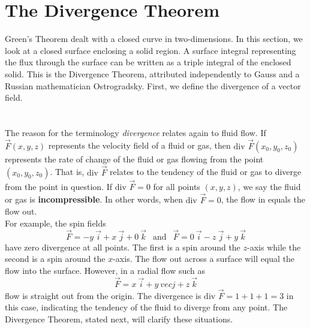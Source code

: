 \section{The Divergence Theorem}\label{sec:div_theorem}

Green's Theorem dealt with a closed curve in two-dimensions.  In this section, we look at a closed surface enclosing a solid region.  A surface integral representing the flux through the surface can be written as a triple integral of the enclosed solid.  This is the Divergence Theorem, attributed independently to Gauss and a Russian mathematician Ostrogradsky. First, we define the divergence of a vector field.\\

\\

\\

The reason for the terminology \emph{divergence} relates again to fluid flow. If $\vec F(x,y,z)$ represents the velocity field of a fluid or gas, then $\text{div } \vec F (x_0,y_0,z_0)$ represents the rate of change of the fluid or gas flowing from the point $(x_0,y_0,z_0)$. That is, $\text{div } \vec F$ relates to the tendency of the fluid or gas to diverge from the point in question. If $\text{div } \vec F = 0$ for all points $(x,y,z)$, we say the fluid or gas is \textbf{incompressible}. In other words, when $\text{div } \vec F = 0$, the flow in equals the flow out.\\

For example, the spin fields $$\vec F = -y \: \vec i + x \: \vec j + 0 \: \vec k \: \: \text{ and } \: \: \vec F = 0 \: \vec i - z \: \vec j + y \: \vec k$$
have zero divergence at all points.  The first is a spin around the $z$-axis while the second is a spin around the $x$-axis.  The flow out across a surface will equal the flow into the surface. However, in a radial flow such as $$\vec F = x \: \vec i + y \: vec j + z \: \vec k$$ flow is straight out from the origin.  The divergence is $\text{div } \vec F = 1 + 1 + 1 = 3$ in this case, indicating the tendency of the fluid to diverge from any point.  The Divergence Theorem, stated next, will clarify these situations.\\

